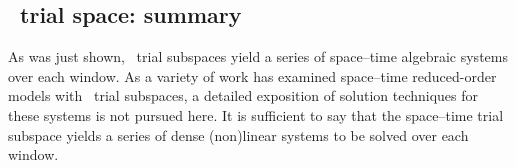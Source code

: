 
\subsection{\spaceTimeAcronym\ trial space: summary}
As was just shown, \spaceTimeAcronym\ trial subspaces yield a series of space--time algebraic systems over each window. As a variety of work has examined space--time reduced-order models with \spaceTimeAcronym\ trial subspaces, 
a detailed exposition of solution techniques for these systems is not pursued here. It is sufficient to say that the 
space--time trial subspace yields a series of dense (non)linear systems to be solved over each window.
